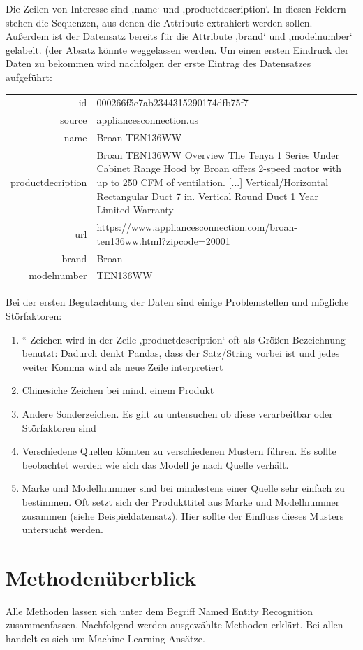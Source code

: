 \documentclass[paper=a4,12pt,listof=totoc]{scrartcl}%
\begin{document}
	Die Zeilen von Interesse sind ‚name‘ und ‚productdescription‘. In diesen Feldern stehen die Sequenzen, aus denen die Attribute extrahiert werden sollen. Außerdem ist der Datensatz bereits für die Attribute ‚brand‘ und ‚modelnumber‘ gelabelt. 
	(der Absatz könnte weggelassen werden. Um einen ersten Eindruck der Daten zu bekommen wird nachfolgen der erste Eintrag des Datensatzes aufgeführt:\\
	\begin{tabular}[h]{rp{11.2cm}}
		id & 000266f5e7ab2344315290174dfb75f7 \\
		source & appliancesconnection.us\\
		name & Broan TEN136WW\\
		productdecription & Broan TEN136WW Overview The Tenya 1 Series Under Cabinet Range Hood by Broan offers 2-speed motor with up to 250 CFM of ventilation. [...] Vertical/Horizontal Rectangular Duct 7 in. Vertical Round Duct 1 Year Limited Warranty\\
		url & https://www.appliancesconnection.com/broan-ten136ww.html?zipcode=20001\\
		brand & Broan\\
		modelnumber & TEN136WW
	\end{tabular}
	\newline
	\newline
	Bei der ersten Begutachtung der Daten sind einige Problemstellen und mögliche Störfaktoren:
	\begin{enumerate}
		\item “-Zeichen wird in der Zeile ‚productdescription‘ oft als Größen Bezeichnung benutzt: Dadurch denkt Pandas, dass der Satz/String vorbei ist und jedes weiter Komma wird als neue Zeile interpretiert
		\item Chinesiche Zeichen bei mind. einem Produkt
		\item Andere Sonderzeichen. Es gilt zu untersuchen ob diese verarbeitbar  oder Stör\-faktoren sind
		\item Verschiedene Quellen könnten zu verschiedenen Mustern führen. Es sollte beobachtet werden wie sich das Modell je nach Quelle verhält.
		\item Marke und Modellnummer sind bei mindestens einer Quelle sehr einfach zu bestimmen. Oft setzt sich der Produkttitel aus Marke und Modellnummer zusammen (siehe Beispieldatensatz). Hier sollte der Einfluss dieses Musters untersucht werden.
	\end{enumerate}

	\section{Methodenüberblick}
	Alle Methoden lassen sich unter dem Begriff Named Entity Recognition zusammenfassen.	Nachfolgend werden ausgewählte Methoden erklärt. Bei allen handelt es sich um Machine Learning Ansätze. 
	
\end{document}
